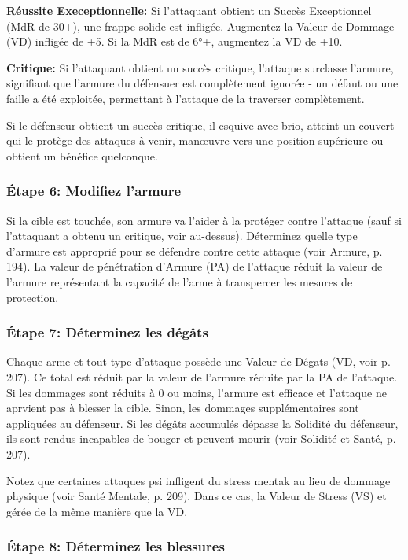 \textbf{Réussite Execeptionnelle:} Si l'attaquant obtient un Succès Exceptionnel (MdR de 30+), une frappe solide est infligée. Augmentez la Valeur de Dommage (VD) infligée de +5. Si la MdR est de 6°+, augmentez la VD de +10. 

\textbf{Critique:} Si l'attaquant obtient un succès critique, l'attaque surclasse l'armure, signifiant que l'armure du défensuer est complètement ignorée - un défaut ou une faille a été exploitée, permettant à l'attaque de la traverser complètement. 

Si le défenseur obtient un succès critique, il esquive avec brio, atteint un couvert qui le protège des attaques à venir, manœuvre vers une position supérieure ou obtient un bénéfice quelconque. 

\subsubsection{Étape 6: Modifiez l'armure} 

Si la cible est touchée, son armure va l'aider à la protéger contre l'attaque (sauf si l'attaquant a obtenu un critique, voir au-dessus). Déterminez quelle type d'armure est approprié pour se défendre contre cette attaque (voir Armure, p. 194). La valeur de pénétration d'Armure (PA) de l'attaque réduit la valeur de l'armure représentant la capacité de l'arme à transpercer les mesures de protection. 

\subsubsection{Étape 7: Déterminez les dégâts} 

Chaque arme et tout type d'attaque possède une Valeur de Dégats (VD, voir p. 207). Ce total est réduit par la valeur de l'armure réduite par la PA de l'attaque. Si les dommages sont réduits à 0 ou moins, l'armure est efficace et l'attaque ne aprvient pas à blesser la cible. Sinon, les dommages supplémentaires sont appliquées au défenseur. Si les dégâts accumulés dépasse la Solidité du défenseur, ils sont rendus incapables de bouger et peuvent mourir (voir Solidité et Santé, p. 207). 

Notez que certaines attaques psi infligent du stress mentak au lieu de dommage physique (voir Santé Mentale, p. 209). Dans ce cas, la Valeur de Stress (VS) et gérée de la même manière que la VD. 

\subsubsection{Étape 8: Déterminez les blessures} 

